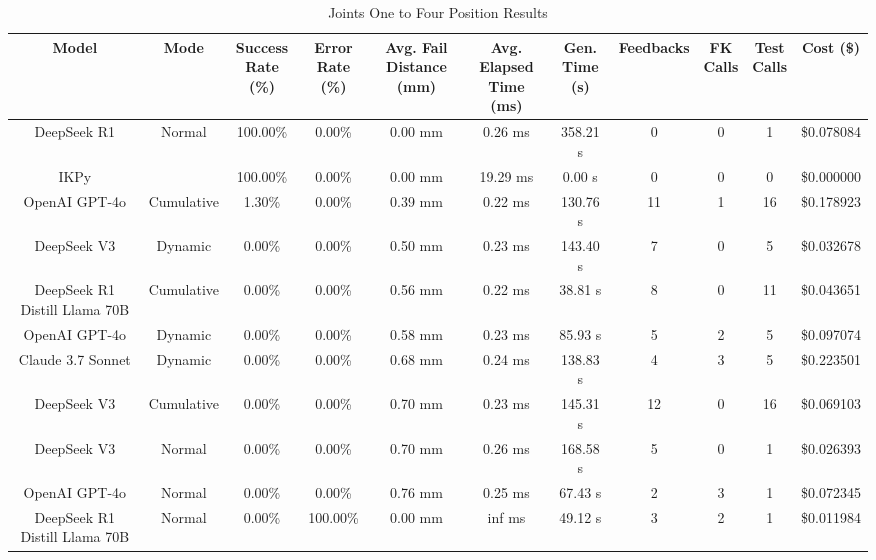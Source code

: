 \begin{table}[H]
\tiny
\renewcommand{\arraystretch}{1.2}
\caption{Joints One to Four Position Results}
\begin{center}
\begin{tabular}{|c|c|c|c|c|c|c|c|c|c|c|}
    \hline
    \textbf{Model} & 
    \textbf{Mode} & 
    \makecell{\textbf{Success}\\\textbf{Rate (\%)}} &
    \makecell{\textbf{Error}\\\textbf{Rate (\%)}} &
    \makecell{\textbf{Avg. Fail}\\\textbf{Distance (mm)}} &
    \makecell{\textbf{Avg. Elapsed}\\\textbf{Time (ms)}} &
    \makecell{\textbf{Gen.}\\\textbf{Time (s)}} &
    \textbf{Feedbacks} &
    \makecell{\textbf{FK}\\\textbf{Calls}} &
    \makecell{\textbf{Test}\\\textbf{Calls}} &
    \textbf{Cost (\$)} \\
    \hline
    DeepSeek R1 & Normal & 100.00\% & 0.00\% & 0.00 mm & 0.26 ms & 358.21 s & 0 & 0 & 1 & \$0.078084 \\
    \hline
    IKPy &  & 100.00\% & 0.00\% & 0.00 mm & 19.29 ms & 0.00 s & 0 & 0 & 0 & \$0.000000 \\
    \hline
    OpenAI GPT-4o & Cumulative & 1.30\% & 0.00\% & 0.39 mm & 0.22 ms & 130.76 s & 11 & 1 & 16 & \$0.178923 \\
    \hline
    DeepSeek V3 & Dynamic & 0.00\% & 0.00\% & 0.50 mm & 0.23 ms & 143.40 s & 7 & 0 & 5 & \$0.032678 \\
    \hline
    DeepSeek R1 Distill Llama 70B & Cumulative & 0.00\% & 0.00\% & 0.56 mm & 0.22 ms & 38.81 s & 8 & 0 & 11 & \$0.043651 \\
    \hline
    OpenAI GPT-4o & Dynamic & 0.00\% & 0.00\% & 0.58 mm & 0.23 ms & 85.93 s & 5 & 2 & 5 & \$0.097074 \\
    \hline
    Claude 3.7 Sonnet & Dynamic & 0.00\% & 0.00\% & 0.68 mm & 0.24 ms & 138.83 s & 4 & 3 & 5 & \$0.223501 \\
    \hline
    DeepSeek V3 & Cumulative & 0.00\% & 0.00\% & 0.70 mm & 0.23 ms & 145.31 s & 12 & 0 & 16 & \$0.069103 \\
    \hline
    DeepSeek V3 & Normal & 0.00\% & 0.00\% & 0.70 mm & 0.26 ms & 168.58 s & 5 & 0 & 1 & \$0.026393 \\
    \hline
    OpenAI GPT-4o & Normal & 0.00\% & 0.00\% & 0.76 mm & 0.25 ms & 67.43 s & 2 & 3 & 1 & \$0.072345 \\
    \hline
    DeepSeek R1 Distill Llama 70B & Normal & 0.00\% & 100.00\% & 0.00 mm & inf ms & 49.12 s & 3 & 2 & 1 & \$0.011984 \\
    \hline
\end{tabular}
\label{Results-Position-1-4}
\end{center}
\end{table}


